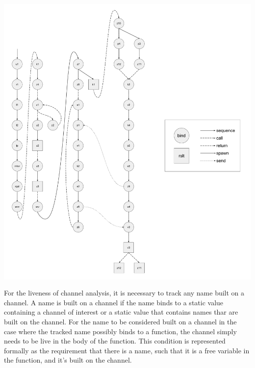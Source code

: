 \documentclass[letterpaper, 11pt]{report}
\begin{document}
\includegraphics[width=1\textwidth]{cml-graph-lp.pdf}

For the liveness of channel analysis, it is necessary to track any name built on a channel.
A name is built on a channel if the name binds to a static value 
containing a channel of interest or a static value that contains names thar are built on the channel.
For the name to be considered built on a channel in the case where the tracked name possibly binds to a function,
the channel simply needs to be live in the body of the function.
This condition is represented formally as the requirement that there is a 
name, such that it is a free variable in the function, and it's built on the channel.
\end{document}
